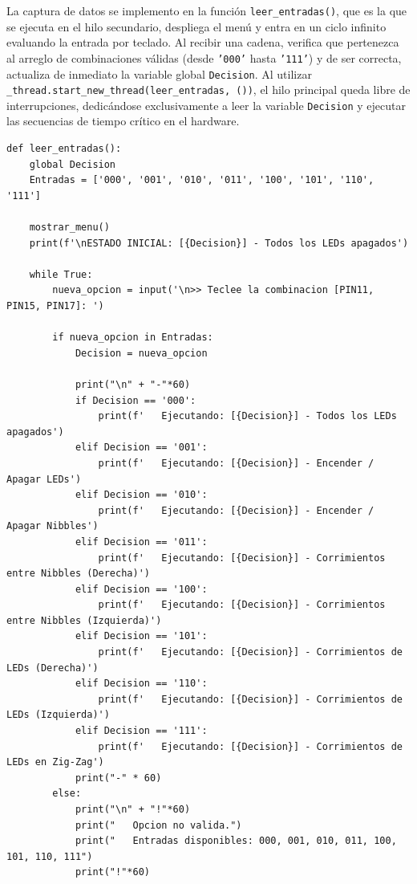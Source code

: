 \documentclass[letterpaper,12pt]{article}
\begin{document}
    La captura de datos se implemento en la función \texttt{leer\_entradas()}, que es la que se ejecuta en el hilo secundario, despliega el menú y entra en un ciclo infinito evaluando la entrada por teclado. Al recibir una cadena, verifica que pertenezca al arreglo de combinaciones válidas (desde \texttt{'000'} hasta \texttt{'111'}) y de ser correcta, actualiza de inmediato la variable global \texttt{Decision}. Al utilizar \texttt{\_thread.start\_new\_thread(leer\_entradas, ())}, el hilo principal queda libre de interrupciones, dedicándose exclusivamente a leer la variable \texttt{Decision} y ejecutar las secuencias de tiempo crítico en el hardware.

    \begin{lstlisting}[language={[LAB]Python}, caption={Interfaz de menú y función de lectura en hilo secundario}]
def leer_entradas():
    global Decision
    Entradas = ['000', '001', '010', '011', '100', '101', '110', '111']
    
    mostrar_menu()
    print(f'\nESTADO INICIAL: [{Decision}] - Todos los LEDs apagados')
    
    while True:
        nueva_opcion = input('\n>> Teclee la combinacion [PIN11, PIN15, PIN17]: ')
        
        if nueva_opcion in Entradas:
            Decision = nueva_opcion
            
            print("\n" + "-"*60)
            if Decision == '000':
                print(f'   Ejecutando: [{Decision}] - Todos los LEDs apagados')
            elif Decision == '001':
                print(f'   Ejecutando: [{Decision}] - Encender / Apagar LEDs')
            elif Decision == '010':
                print(f'   Ejecutando: [{Decision}] - Encender / Apagar Nibbles')
            elif Decision == '011':
                print(f'   Ejecutando: [{Decision}] - Corrimientos entre Nibbles (Derecha)')
            elif Decision == '100':
                print(f'   Ejecutando: [{Decision}] - Corrimientos entre Nibbles (Izquierda)')
            elif Decision == '101':
                print(f'   Ejecutando: [{Decision}] - Corrimientos de LEDs (Derecha)')
            elif Decision == '110':
                print(f'   Ejecutando: [{Decision}] - Corrimientos de LEDs (Izquierda)')
            elif Decision == '111':
                print(f'   Ejecutando: [{Decision}] - Corrimientos de LEDs en Zig-Zag')
            print("-" * 60)
        else:
            print("\n" + "!"*60)
            print("   Opcion no valida.")
            print("   Entradas disponibles: 000, 001, 010, 011, 100, 101, 110, 111")
            print("!"*60)
    \end{lstlisting}
\end{document}

